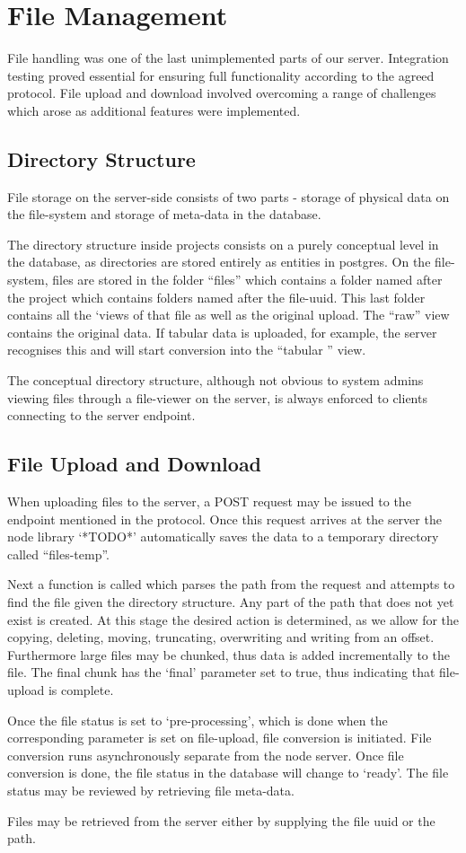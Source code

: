 \section{File Management}
File handling was one of the last unimplemented parts of our server. Integration testing proved essential for ensuring full functionality according to the agreed protocol. File upload and download involved overcoming a range of challenges which arose as additional features were implemented. 

\subsection{Directory Structure}
File storage on the server-side consists of two parts - storage of physical data on the file-system and storage of meta-data in the database. 

The directory structure inside projects consists on a purely conceptual level in the database, as directories are stored entirely as entities in postgres. On the file-system, files are stored in the folder ``files'' which contains a folder named after the project which contains folders named after the file-uuid. This last folder contains all the `views of that file as well as the original upload. The ``raw'' view contains the original data. If tabular data is uploaded, for example, the server recognises this and will start conversion into the ``tabular '' view.

The conceptual directory structure, although not obvious to system admins viewing files through a file-viewer on the server, is always enforced to clients connecting to the server endpoint. 

\subsection{File Upload and Download}
When uploading files to the server, a POST request may be issued to the endpoint mentioned in the protocol. Once this request arrives at the server the node library `*TODO*' automatically saves the data to a temporary directory called ``files-temp''. 

Next a function is called which parses the path from the request and attempts to find the file given the directory structure. Any part of the path that does not yet exist is created. At this stage the desired action is determined, as we allow for the copying, deleting, moving, truncating, overwriting and writing from an offset. Furthermore large files may be chunked, thus data is added incrementally to the file. The final chunk has the `final' parameter set to true, thus indicating that file-upload is complete.

Once the file status is set to `pre-processing', which is done when the corresponding parameter is set on file-upload, file conversion is initiated. File conversion runs asynchronously separate from the node server. Once file conversion is done, the file status in the database will change to `ready'. The file status may be reviewed by retrieving file meta-data. 

Files may be retrieved from the server either by supplying the file uuid or the path. 
